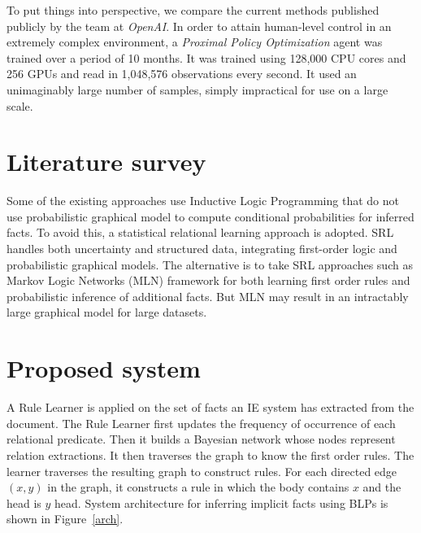 \documentclass[12pt,a4paper]{article}
\begin{document}
To put things into perspective, we compare the current methods published 
publicly by the team at \textit{OpenAI}. In order to attain human-level control
in an extremely complex environment, a \textit{Proximal Policy Optimization}
agent was  trained over a period of 10 months. It was trained using
128,000 CPU cores and 256 GPUs and read in 1,048,576 observations 
every second. It used an unimaginably large number of samples, 
simply impractical for use on a large scale.


\section{Literature survey}
Some of the existing approaches use Inductive Logic Programming that
do not use probabilistic graphical model to compute conditional
probabilities for inferred facts. To avoid this, a statistical
relational learning approach is adopted. SRL handles both uncertainty
and structured data, integrating first-order logic and probabilistic
graphical models. The alternative is to take SRL approaches such as
Markov Logic Networks (MLN) framework for both learning first order
rules and probabilistic inference of additional facts. But MLN may
result in an intractably large graphical model for large datasets.

\section{Proposed system}

A Rule Learner is applied on the set of facts an IE system has
extracted from the document. The Rule Learner first updates the
frequency of occurrence of each relational predicate. Then it builds a
Bayesian network whose nodes represent relation extractions. It then
traverses the graph to know the first order rules. The learner
traverses the resulting graph to construct rules. For each directed
edge $(x,y)$ in the graph, it constructs a rule in which the body
contains $x$ and the head is $y$ head. System architecture for
inferring implicit facts using BLPs is shown in Figure~\ref{arch}.
\end{document}
